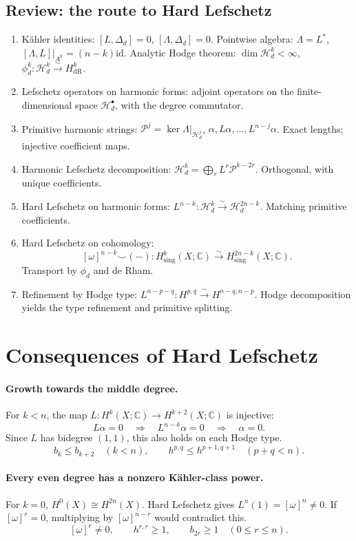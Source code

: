 \documentclass[11pt]{article}
\newcommand{\C}{\mathbb C}
\newcommand{\Hd}{\mathcal H_d}
\newcommand{\Prim}{\mathcal P}
\newcommand{\dR}{\mathrm{dR}}
\newcommand{\id}{\mathrm{id}}
\begin{document}
\subsection*{Review: the route to Hard Lefschetz}
\begin{enumerate}
\item K\"ahler identities: $[L,\Delta_d]=0$, $[\Lambda,\Delta_d]=0$.
Pointwise algebra: $\Lambda=L^*$, $[\Lambda,L]|_{A^k}=(n-k)\id$.
Analytic Hodge theorem: $\dim\Hd^k<\infty$,
$\phi_d^k:\Hd^k\xrightarrow{\sim}H^k_{\dR}$.
\item Lefschetz operators on harmonic forms: adjoint operators on the
finite-dimensional space $\Hd^{\bullet}$, with the degree commutator.
\item Primitive harmonic strings:
$\Prim^j=\ker\Lambda|_{\Hd^j}$,
$\alpha,L\alpha,\ldots,L^{n-j}\alpha$.
Exact lengths; injective coefficient maps.
\item Harmonic Lefschetz decomposition:
$\Hd^k=\bigoplus_rL^r\Prim^{k-2r}$.
Orthogonal, with unique coefficients.
\item Hard Lefschetz on harmonic forms:
$L^{n-k}:\Hd^k\xrightarrow{\sim}\Hd^{2n-k}$.
Matching primitive coefficients.
\item Hard Lefschetz on cohomology:
\[
 [\omega]^{n-k}\smile(-):H^k_{\mathrm{sing}}(X;\C)
 \xrightarrow{\sim}H^{2n-k}_{\mathrm{sing}}(X;\C).
\]
Transport by $\phi_d$ and de Rham.
\item Refinement by Hodge type:
$L^{n-p-q}:H^{p,q}\xrightarrow{\sim}H^{n-q,n-p}$.
Hodge decomposition yields the type refinement and primitive splitting.
\end{enumerate}

\section*{Consequences of Hard Lefschetz}
\paragraph{Growth towards the middle degree.}
For $k<n$, the map $L:H^k(X;\C)\longrightarrow H^{k+2}(X;\C)$
is injective:
\[
 L\alpha=0\quad\Longrightarrow\quad L^{n-k}\alpha=0
 \quad\Longrightarrow\quad\alpha=0.
\]
Since $L$ has bidegree $(1,1)$, this also holds on each Hodge type.
\[
 b_k\leq b_{k+2}\quad(k<n),\qquad
 h^{p,q}\leq h^{p+1,q+1}\quad(p+q<n).
\]
\paragraph{Every even degree has a nonzero K\"ahler-class power.}
For $k=0$, $H^0(X)\cong H^{2n}(X)$.
Hard Lefschetz gives $L^n(1)=[\omega]^n\neq0$.
If $[\omega]^r=0$, multiplying by $[\omega]^{n-r}$ would contradict this.
\[
 [\omega]^r\neq0,\qquad h^{r,r}\geq1,\qquad b_{2r}\geq1
 \quad(0\leq r\leq n).
\]
\end{document}
